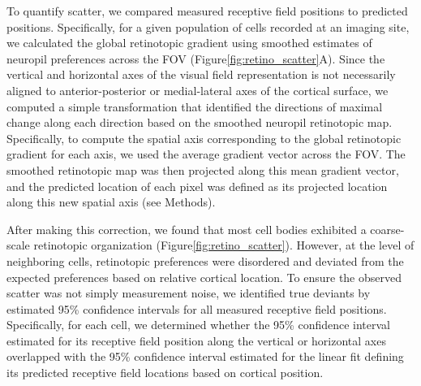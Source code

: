 To quantify scatter, we compared measured receptive field positions to predicted positions. Specifically, for a given population of cells recorded at an imaging site, we calculated the global retinotopic gradient using smoothed estimates of neuropil preferences across the FOV (Figure\ref{fig:retino_scatter}A). Since the vertical and horizontal axes of the visual field representation is not necessarily aligned to anterior-posterior or medial-lateral axes of the cortical surface, we computed a simple transformation that identified the directions of maximal change along each direction based on the smoothed neuropil retinotopic map. Specifically, to compute the spatial axis corresponding to the global retinotopic gradient for each axis, we used the average gradient vector across the FOV. The smoothed retinotopic map was then 
projected along this mean gradient vector, and the predicted location of each pixel was defined as its projected location along this new spatial axis (see Methods).  

After making this correction, we found that most cell bodies exhibited a coarse-scale retinotopic organization (Figure\ref{fig:retino_scatter}). However, at the level of neighboring cells, retinotopic preferences were disordered and deviated from the expected preferences based on relative cortical location. To ensure the observed scatter was not simply measurement noise, we identified true deviants by estimated 95\% confidence intervals for all measured receptive field positions. Specifically, for each cell, we determined whether the 95\% confidence interval estimated for its receptive field position along the vertical or horizontal axes overlapped with the 95\% confidence interval estimated for the linear fit defining its predicted receptive field locations based on cortical position.  

